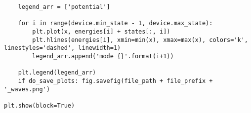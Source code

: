 \begin{lstlisting}
    legend_arr = ['potential']

    for i in range(device.min_state - 1, device.max_state):
        plt.plot(x, energies[i] + states[:, i])
        plt.hlines(energies[i], xmin=min(x), xmax=max(x), colors='k', linestyles='dashed', linewidth=1)
        legend_arr.append('mode {}'.format(i+1))

    plt.legend(legend_arr)
    if do_save_plots: fig.savefig(file_path + file_prefix + '_waves.png')

plt.show(block=True)
\end{lstlisting}